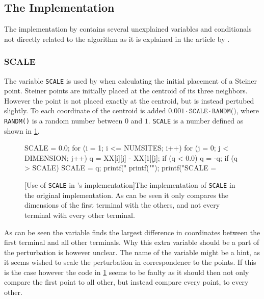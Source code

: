 \subsection{The Implementation}
\label{sec:implementation}

The implementation by \citeauthor{smith1992} contains several unexplained variables and conditionals not
directly related to the algorithm as it is explained in the article by \textcite{smith1992}.

\subsubsection{SCALE}
\label{sec:scale}

The variable \texttt{SCALE} is used by \citeauthor{smith1992} when calculating the initial
placement of a Steiner point. Steiner points are initially placed at the
centroid of its three neighbors. However the point is not placed exactly at the
centroid, but is instead pertubed slightly. To each coordinate of the centroid
is added $0.001 \cdot \texttt{SCALE} \cdot \texttt{RANDM()}$, where \texttt{RANDM()} is a
random number between $0$ and $1$. \texttt{SCALE} is a number defined as shown
in \cref{fig:randm}.

\begin{figure}[htbp]
\begin{c-code}
SCALE = 0.0;
for (i = 1; i <= NUMSITES; i++) {
  for (j = 0; j < DIMENSION; j++) {
    q = XX[i][j] - XX[1][j];
    if (q < 0.0) q = -q;
    if (q > SCALE) SCALE = q;
    printf(" %
  }
  printf("\n");
}
printf("SCALE = %
\end{c-code}
  [Use of \texttt{SCALE} in \citeauthor{smith1992}'s implementation]{The implementation
    of \texttt{SCALE} in the original implementation. As can be seen it only
    compares the dimensions of the first terminal with the others, and not every
    terminal with every other terminal.\label{fig:randm}}
\end{figure}

As can be seen the variable finds the largest difference in coordinates between the first
terminal and all other terminals. Why this extra variable should be a part of
the perturbation is however unclear. The name of the variable might be a hint,
as it seems \citeauthor{smith1992} wished to scale the perturbation in correspondence to the
points. If this is the case however the code in \cref{fig:randm} seems to be
faulty as it should then not only compare the first point to all other, but
instead compare every point, to every other.


